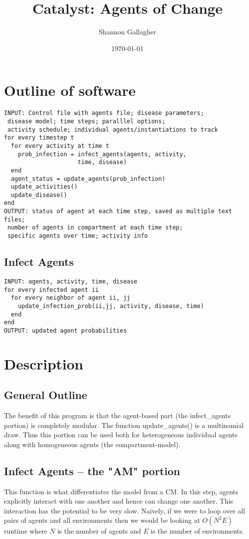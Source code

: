\documentclass{article}
\author{Shannon Gallagher}
\date{\today}
\title{Catalyst: Agents of Change}
\begin{document}
\maketitle


\section{Outline of software}
\label{sec-1}
\begin{verbatim}
INPUT: Control file with agents file; disease parameters;
 disease model; time steps; paralllel options;
 activity schedule; individual agents/instantiations to track
for every timestep t
  for every activity at time t
    prob_infection = infect_agents(agents, activity, 
                     time, disease)
  end
  agent_status = update_agents(prob_infection)
  update_activities()
  update_disease()
end
OUTPUT: status of agent at each time step, saved as multiple text files;
 number of agents in compartment at each time step;
 specific agents over time; activity info
\end{verbatim}

\subsection{Infect Agents}
\label{sec-1-1}
\begin{verbatim}
INPUT: agents, activity, time, disease
for every infected agent ii
  for every neighbor of agent ii, jj
    update_infection_prob(ii,jj, activity, disease, time)
  end
end
OUTPUT: updated agent probabilities
\end{verbatim}

\section{Description}
\label{sec-2}
\subsection{General Outline}
\label{sec-2-1}


The benefit of this program is that the agent-based part (the infect\_agents portion) is completely modular.  The function update\_agents() is a multinomial draw.  Thus this portion can be used both for heterogeneous individual agents along with homogeneous agents (the compartment-model).

\subsection{Infect Agents -- the "AM" portion}
\label{sec-2-2}
This function is what differentiates the model from a CM. In this step, agents explicitly interact with one another and hence can change one another.  This interaction has the potential to be very slow.  Naively, if we were to loop over all pairs of agents and all environments then we would be looking at $O(N^2E)$ runtime where $N$ is the number of agents and $E$ is the number of environments.
\end{document}
